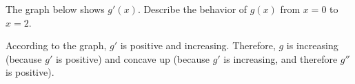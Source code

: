 \begin{Exercise}[label=concavity2]
	The graph below shows $g'(x)$. Describe the behavior of $g(x)$ from $x=0$ to $x=2$. 
\end{Exercise}

\begin{Answer}[ref=concavity2]
	According to the graph, $g'$ is positive and increasing. Therefore, $g$ is increasing (because $g'$ is positive) and concave up (because $g'$ is increasing, and therefore $g''$ is positive).
\end{Answer}
